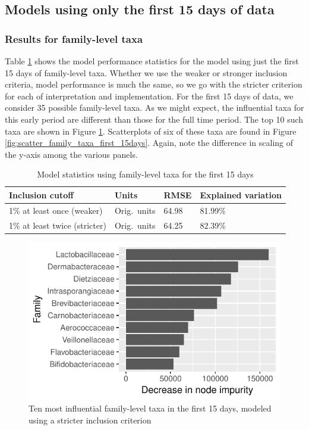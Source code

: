 \documentclass{article}
\begin{document}
\subsection{Models using only the first 15 days of data}

\subsubsection{Results for family-level taxa}

Table \ref{tbl:family_first_15days_model_stats} shows the model
performance statistics for the model using just the first 15 days of
family-level taxa.  Whether we use the weaker or stronger inclusion
criteria, model performance is much the same, so we go with the
stricter criterion for each of interpretation and implementation.  For
the first 15 days of data, we consider 35 possible family-level taxa.
As we might expect, the influential taxa for this early period are
different than those for the full time period.  The top 10 such taxa
are shown in Figure
\ref{fig:infl_family_taxa_first_15days_stric_crit}.  Scatterplots of
six of these taxa are found in Figure
\ref{fig:scatter_family_taxa_first_15days}.  Again, note the
difference in scaling of the y-axis among the various panels.

\begin{table}
  \centering
  \caption{\label{tbl:family_first_15days_model_stats}Model statistics using family-level taxa for the first 15 days}
\begin{tabular}{llll}
Inclusion cutoff & Units  & RMSE & Explained variation\\ \hline
1\% at least once (weaker) & Orig.~units & 64.98 & 81.99\%\\
1\% at least twice (stricter) & Orig.~units & 64.25 & 82.39\%
\end{tabular}
\end{table}

\begin{figure}
  \centering
  \includegraphics{../../only_families/first_two_weeks/hit_1perc_twice/orig_units_first_two_weeks_families_barchart}
  \caption{Ten most influential family-level taxa in the first 15 days, modeled using a stricter inclusion criterion}
  \label{fig:infl_family_taxa_first_15days_stric_crit}
\end{figure}
\end{document}

